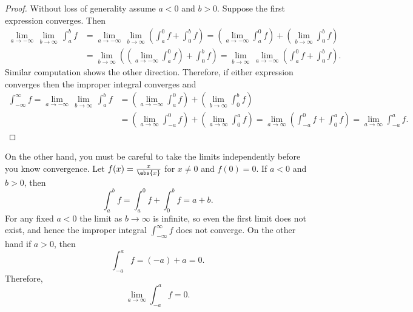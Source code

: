\documentclass[12pt]{book}
\begin{document}
\begin{proof}
Without loss of generality assume $a < 0$ and $b > 0$.
Suppose
the first expression converges.
Then
\begin{equation*}
\begin{split}
\lim_{a \to -\infty} \, \lim_{b \to \infty} \, \int_a^b f
& =
\lim_{a \to -\infty} \, \lim_{b \to \infty}
\left(
\int_a^0 f
+
\int_0^b f
\right)
=
\left(
\lim_{a \to -\infty}
\int_a^0 f
\right)
+
\left(
 \lim_{b \to \infty}
\int_0^b f
\right) \\
& = 
 \lim_{b \to \infty}
\left(
\left(
\lim_{a \to -\infty}
\int_a^0 f
\right) 
+
\int_0^b f
\right)
=
 \lim_{b \to \infty} \,
\lim_{a \to -\infty}
\left(
\int_a^0 f
+
\int_0^b f
\right)  .
\end{split}
\end{equation*}
Similar computation shows the other direction.
Therefore, if
either expression converges then the improper integral converges
and
\begin{equation*}
\begin{split}
\int_{-\infty}^\infty f
=
\lim_{a \to -\infty} \, \lim_{b \to \infty} \, \int_a^b f
& =
\left(
\lim_{a \to -\infty}
\int_a^0 f
\right)
+
\left(
 \lim_{b \to \infty}
\int_0^b f
\right)
\\
& =
\left(
\lim_{a \to \infty}
\int_{-a}^0 f
\right)
+
\left(
 \lim_{a \to \infty}
\int_0^a f
\right)
=
\lim_{a \to \infty}
\left(
\int_{-a}^0 f
+
\int_0^a f
\right)
=
\lim_{a \to \infty}
\int_{-a}^a f .
\end{split}
\end{equation*}
\end{proof}

\begin{example}
On the other hand, you must be careful to
take the limits independently before you know convergence.
Let
$f(x) = \frac{x}{\abs{x}}$ for $x \not= 0$ and $f(0) = 0$.
If $a < 0$ and $b > 0$, then
\begin{equation*}
\int_{a}^b f
=
\int_{a}^0 f
+
\int_{0}^b f
=
a+b .
\end{equation*}
For any fixed $a < 0$ the limit as $b \to \infty$ is infinite, so even
the first limit does not exist, and hence the improper integral
$\int_{-\infty}^\infty f$
does not converge.
On the other hand if $a > 0$, then
\begin{equation*}
\int_{-a}^{a} f
=
(-a)+a = 0 .
\end{equation*}
Therefore,
\begin{equation*}
\lim_{a\to\infty}
\int_{-a}^{a} f
= 0 .
\end{equation*}
\end{example}
\end{document}
